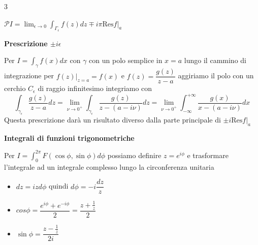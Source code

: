 \documentclass[10pt,a4paper]{report}
\begin{document}
\begin{multicols*}{3}
\begin{center}
\begin{itemize}[label=$\cdot$]
		$\mathcal{P}I=\lim_{\epsilon\rightarrow 0} \int_{\Gamma_{\epsilon}}f(z)dz\mp i \pi \left.\text{Res}f\right|_{a}$
	\end{itemize}
\par
\textbf{Prescrizione \boldmath$\pm i\epsilon$\unboldmath} \par
Per $I=\int_\gamma f(x)dx$ con $\gamma$  con un polo semplice in $x=a$ lungo il cammino di integrazione per $\left.f(z)\right|_{z=a}=f(x)$ e $f(z)=\dfrac{g(z)}{z-a}$ aggiriamo il polo con un cerchio $C_\epsilon$ di raggio infinitesimo integriamo con
\[
\int_{\gamma_\epsilon}\dfrac{g(z)}{z-a}dz=\lim_{\nu\rightarrow 0^+} \int_{\gamma_\epsilon}\dfrac{g(z)}{z-(a-i\nu)}dz=\lim_{\nu\rightarrow 0^+} \int_{-\infty}^{+\infty}\dfrac{g(x)}{x-(a-i\nu)}dx
\]
Questa prescrizione darà un risultato diverso dalla parte principale di $\pm i \left.\text{Res}f\right|_a$
\par
\textbf{Integrali di funzioni trigonometriche} \par
Per $I=\int_0^{2\pi} F(\cos{\phi},\sin{\phi})d\phi$ possiamo definire $z=e^{i\phi}$ e trasformare l'integrale ad un integrale complesso lungo la circonferenza unitaria
	\begin{itemize}[label=$\cdot$]
		\item $dz=izd\phi$ quindi $d\phi=-i\dfrac{dz}{z}$
		\item $cos{\phi}=\dfrac{e^{i\phi}+e^{-i\phi}}{2}=\dfrac{z+\frac{1}{z}}{2}$
		\item $\sin{\phi}=\dfrac{z-\frac{1}{z}}{2i}$
	\end{itemize}

\newpage


\end{center}
\end{multicols*}
\end{document}
